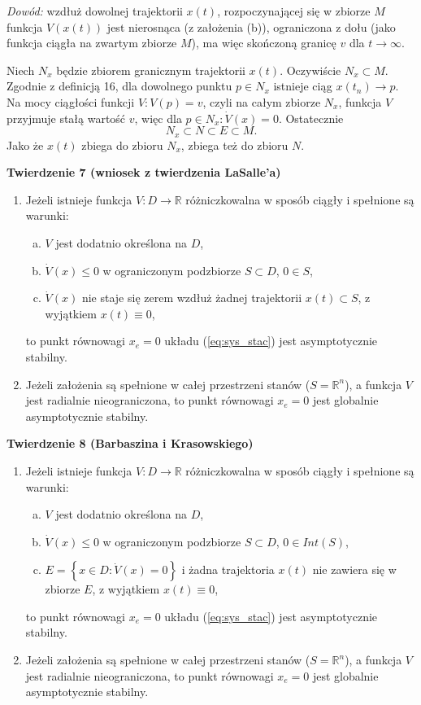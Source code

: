 \documentclass{article}
\begin{document}
\textit{Dowód:}
wzdłuż dowolnej trajektorii $x(t)$, rozpoczynającej się w zbiorze $M$ funkcja $V(x(t))$ jest nierosnąca (z założenia (b)), ograniczona z dołu (jako funkcja ciągła na zwartym zbiorze $M$), ma więc skończoną granicę $v$ dla $t \rightarrow \infty$.

Niech $N_{x}$ będzie zbiorem granicznym trajektorii $x(t)$.
Oczywiście $N_{x} \subset M$. Zgodnie z definicją 16, dla dowolnego punktu $p\in N_{x}$ istnieje ciąg $x(t_{n}) \rightarrow p$.
Na mocy ciągłości funkcji $V: V(p) = v$, czyli na całym zbiorze $N_{x}$, funkcja $V$ przyjmuje stałą wartość $v$, więc dla $p \in N_{x} : \dot{V}(x)=0$.
Ostatecznie
$$
    N_{x} \subset N \subset E \subset M.
$$
Jako że $x(t)$ zbiega do zbioru $N_{x}$, zbiega też do zbioru $N$.

\textbf{Twierdzenie 7 (wniosek z twierdzenia LaSalle'a)}
\begin{enumerate}
    \item Jeżeli istnieje funkcja $V:D\rightarrow\mathbb{R}$ różniczkowalna w sposób ciągły i spełnione są warunki:
    \begin{enumerate}[(a)]
        \item $V$ jest dodatnio określona na $D$,
        \item $\dot{V}(x) \leq 0$ w ograniczonym podzbiorze $S \subset D$, $0 \in S$,
        \item $\dot{V}(x)$ nie staje się zerem wzdłuż żadnej trajektorii $x(t) \subset S$, z wyjątkiem $x(t) \equiv 0$,
    \end{enumerate}
    to punkt równowagi $x_{e} = 0$ układu (\ref{eq:sys_stac}) jest asymptotycznie stabilny.

    \item Jeżeli założenia są spełnione w całej przestrzeni stanów ($S = \mathbb{R}^{n}$), a funkcja $V$ jest radialnie nieograniczona, to punkt równowagi $x_{e} = 0$ jest globalnie asymptotycznie stabilny.
\end{enumerate}

\textbf{Twierdzenie 8 (Barbaszina i Krasowskiego)}
\begin{enumerate}
    \item Jeżeli istnieje funkcja $V:D\rightarrow\mathbb{R}$ różniczkowalna w sposób ciągły i spełnione są warunki:
    \begin{enumerate}[(a)]
        \item $V$ jest dodatnio określona na $D$,
        \item $\dot{V}(x) \leq 0$ w ograniczonym podzbiorze $S \subset D$, $0 \in Int(S)$,
        \item $E = \left\{ x \in D: \dot{V}(x)=0 \right\}$ i żadna trajektoria $x(t)$ nie zawiera się w zbiorze $E$, z wyjątkiem $x(t) \equiv 0$,
    \end{enumerate}
    to punkt równowagi $x_{e} = 0$ układu (\ref{eq:sys_stac}) jest asymptotycznie stabilny.

    \item Jeżeli założenia są spełnione w całej przestrzeni stanów ($S = \mathbb{R}^{n}$), a funkcja $V$ jest radialnie nieograniczona, to punkt równowagi $x_{e} = 0$ jest globalnie asymptotycznie stabilny.
\end{enumerate}
\end{document}
